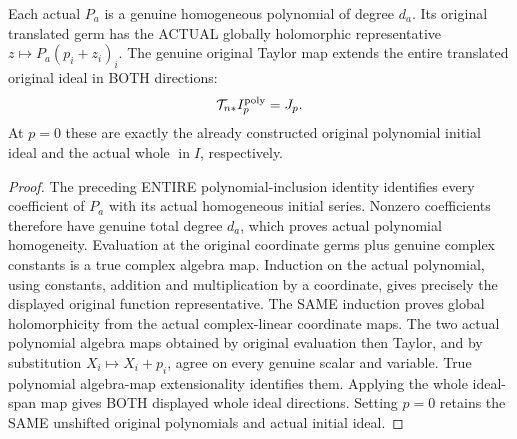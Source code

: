 \begin{lemma}
\label{hir:actual-translated-initial-polynomial-whole-ideals}
Each actual $P_a$ is a genuine homogeneous polynomial of degree $d_a$.
Its original translated germ has the ACTUAL globally holomorphic
representative $z\mapsto P_a(p_i+z_i)_i$. The genuine original Taylor
map extends the entire translated original ideal in BOTH directions:
\[
 \mathcal T_{n*}I_p^{\rm poly}=J_p.
\]
At $p=0$ these are exactly the already constructed original polynomial
initial ideal and the actual whole $\operatorname{in}I$, respectively.
\leanok
\end{lemma}
\begin{proof}
The preceding ENTIRE polynomial-inclusion identity identifies every
coefficient of $P_a$ with its actual homogeneous initial series.
Nonzero coefficients therefore have genuine total degree $d_a$,
which proves actual polynomial homogeneity. Evaluation at the original
coordinate germs plus genuine complex constants is a true complex
algebra map. Induction on the actual polynomial, using constants,
addition and multiplication by a coordinate, gives precisely the
displayed original function representative. The SAME induction proves
global holomorphicity from the actual complex-linear coordinate maps.
The two actual polynomial algebra maps obtained by original evaluation
then Taylor, and by substitution $X_i\mapsto X_i+p_i$, agree on every
genuine scalar and variable. True polynomial algebra-map
extensionality identifies them. Applying the whole ideal-span map
gives BOTH displayed whole ideal directions. Setting $p=0$ retains
the SAME unshifted original polynomials and actual initial ideal.
\end{proof}

